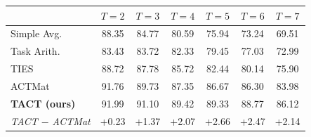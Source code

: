 \begin{tabular}{lcccccc}
\toprule
 & $T=2$ & $T=3$ & $T=4$ & $T=5$ & $T=6$ & $T=7$ \\
\midrule
Simple Avg. & 88.35 & 84.77 & 80.59 & 75.94 & 73.24 & 69.51 \\
Task Arith. & 83.43 & 83.72 & 82.33 & 79.45 & 77.03 & 72.99 \\
TIES & 88.72 & 87.78 & 85.72 & 82.44 & 80.14 & 75.90 \\
ACTMat & 91.76 & 89.73 & 87.35 & 86.67 & 86.30 & 83.98 \\
\textbf{TACT (ours)} & 91.99 & 91.10 & 89.42 & 89.33 & 88.77 & 86.12 \\
\midrule
\emph{TACT $-$ ACTMat} & +0.23 & +1.37 & +2.07 & +2.66 & +2.47 & +2.14 \\
\bottomrule
\end{tabular}

